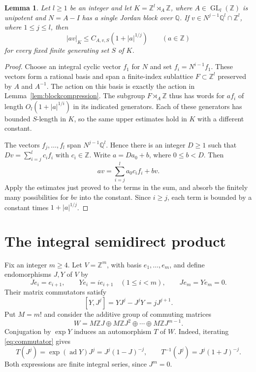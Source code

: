 \documentclass[11pt]{article}
\numberwithin{equation}{section}
\newtheorem{lemma}[theorem]{Lemma}
\theoremstyle{remark}
\newcommand{\Z}{\mathbb Z}
\newcommand{\Q}{\mathbb Q}
\newcommand{\GL}{\operatorname{GL}}
\newcommand{\ad}{\operatorname{ad}}
\begin{document}
\begin{lemma}\label{lem:compression}
Let $l\ge1$ be an integer and let $K=\Z^l\rtimes_A\Z$, where $A\in\GL_l(\Z)$ is unipotent and
$N=A-I$ has a single Jordan block over $\Q$. If
$v\in N^{j-1}\Q^l\cap\Z^l$, where $1\le j\le l$, then
\[
 |av|_K\le C_{A,v,S}(1+|a|^{1/j})\qquad(a\in\Z)
\]
for every fixed finite generating set $S$ of $K$.
\end{lemma}

\begin{proof}
Choose an integral cyclic vector $f_1$ for $N$ and set
$f_i=N^{i-1}f_1$. These vectors form a rational basis and span a
finite-index sublattice $F\subset\Z^l$ preserved by $A$ and $A^{-1}$.
The action on this basis is exactly the action in
Lemma~\ref{lem:blockcompression}. The subgroup $F\rtimes_A\Z$ thus
has words for $af_i$ of length $O_l(1+|a|^{1/i})$ in its indicated
generators. Each of these generators has bounded $S$-length in $K$,
so the same upper estimates hold in $K$ with a different constant.

The vectors $f_j,\ldots,f_l$ span $N^{j-1}\Q^l$. Hence there is an
integer $D\ge1$ such that
$Dv=\sum_{i=j}^l c_i f_i$ with $c_i\in\Z$. Write
$a=Da_0+b$, where $0\le b<D$. Then
\[
 av=\sum_{i=j}^l a_0c_i f_i+bv.
\]
Apply the estimates just proved to the terms in the sum, and absorb the
finitely many possibilities for $bv$ into the constant. Since $i\ge j$,
each term is bounded by a constant times $1+|a|^{1/j}$.
\end{proof}

\section{The integral semidirect product}\label{sec:group}

Fix an integer $m\ge4$. Let $V=\Z^m$, with basis $e_1,\ldots,e_m$,
and define endomorphisms $J,Y$ of $V$ by
\[
 Je_i=e_{i+1},\qquad Ye_i=i e_{i+1}\quad(1\le i<m),
 \qquad Je_m=Ye_m=0.
\]
Their matrix commutators satisfy
\begin{equation}\label{eq:commutator}
 [Y,J^j]=YJ^j-J^jY=jJ^{j+1}.
\end{equation}
Put $M=m!$ and consider the additive group of commuting matrices
\[
 W=M\Z J\oplus M\Z J^2\oplus\cdots\oplus M\Z J^{m-1}.
\]
Conjugation by $\exp Y$ induces an automorphism $T$ of $W$. Indeed,
iterating \eqref{eq:commutator} gives
\begin{equation}\label{eq:T}
 T(J^j)=\exp(\ad Y)J^j=J^j(1-J)^{-j},\qquad
 T^{-1}(J^j)=J^j(1+J)^{-j}.
\end{equation}
Both expressions are finite integral series, since $J^m=0$.
\end{document}
